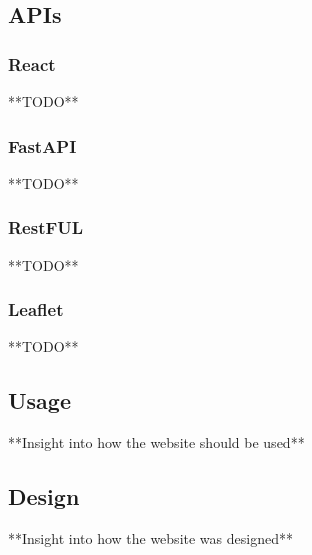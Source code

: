 \documentclass{article}
\begin{document}
\subsection{APIs}

\subsubsection*{React}
**TODO**

\subsubsection*{FastAPI}
**TODO**

\subsubsection*{RestFUL}
**TODO**

\subsubsection*{Leaflet}
**TODO**

\subsection{Usage}
**Insight into how the website should be used**

\subsection{Design}
**Insight into how the website was designed**
\end{document}

